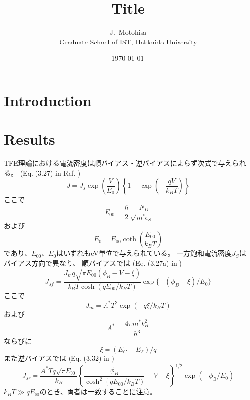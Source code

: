 \documentclass[11pt,uplatex,a4paper]{jsarticle}
\begin{document}
\title{Title}
\author{J.~Motohisa\\Graduate School of IST, Hokkaido University}
\date{\shortdate\today \, \ampmtime }
\maketitle

\section{Introduction}

\section{Results}
TFE理論における電流密度は順バイアス・逆バイアスによらず次式で与えられる。
(Eq. (3.27) in Ref. \cite{rhoderick})
\begin{equation}
 J = J_s \exp\left(\frac{V}{E_0}\right)
  \left\{ 1- \exp\left(- \frac{qV}{k_B T}\right)
									   \right\}
\end{equation}
ここで
\begin{equation}
 E_{00} = \frac{\hbar}{2}
  \sqrt \frac{N_D}{m^* \epsilon_S}
\end{equation}
および
\begin{equation}
 E_{0} = E_{00} \coth \left( \frac{E_{00}}{k_B T}\right)
\end{equation}
であり、$E_{00}$、$E_0$はいずれもeV単位で与えられている。
一方飽和電流密度$J_S$はバイアス方向で異なり、
順バイアスでは (Eq. (3.27a) in \cite{rhoderick})
\begin{equation}
 J_{sf} = \frac{J_m q \sqrt{\pi E_{00} (\phi_B - V- \xi)}}{k_B T \cosh (qE_{00}/k_B T)}
  \exp \{-(\phi_B- \xi)/E_{0}\}
\end{equation}
ここで
\begin{equation}
 J_m = A^* T^2 \exp (-q \xi/k_B T)
\end{equation}
および
\begin{equation}
 A^{*} = \frac{4 \pi m^* k_B^2}{h^3}
\end{equation}
ならびに
\begin{equation}
 \xi = (E_C - E_F)/q
\end{equation}
また逆バイアスでは
(Eq. (3.32) in \cite{rhoderick})
\begin{equation}
 J_{sr} = \frac{A^*T q \sqrt{\pi E_{00}}}{k_B}
  \left\{
   \frac{\phi_B}{\cosh^2(qE_{00}/k_B T)}-V-\xi 
  \right\}^{1/2}
   \exp(-\phi_B/E_0)
\end{equation}
$k_B T \gg q E_{00}$のとき、両者は一致することに注意。
\end{document}
